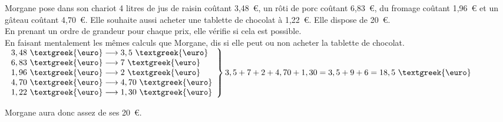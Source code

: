 Morgane pose dans son chariot 4 litres de jus de raisin coûtant
3,48~\textgreek{\euro}, un rôti de porc coûtant
6,83~\textgreek{\euro}, du fromage coûtant 1,96~\textgreek{\euro} et
un gâteau coûtant 4,70~\textgreek{\euro}. Elle souhaite aussi
acheter une tablette de chocolat à 1,22~\textgreek{\euro}. Elle dispose
de 20~\textgreek{\euro}.\\En prenant un ordre de grandeur pour chaque
prix, elle vérifie si cela est possible.
\\En faisant mentalement les mêmes calculs que Morgane, dis si elle
peut ou non acheter la tablette de chocolat.
$\left.\begin{array}{l}
3,48~\mbox{\textgreek{\euro}}\longrightarrow3,5~\mbox{\textgreek{\euro}}\\
6,83~\mbox{\textgreek{\euro}}\longrightarrow7~\mbox{\textgreek{\euro}}\\
1,96~\mbox{\textgreek{\euro}}\longrightarrow2~\mbox{\textgreek{\euro}}\\
4,70~\mbox{\textgreek{\euro}}\longrightarrow4,70~\mbox{\textgreek{\euro}}\\
1,22~\mbox{\textgreek{\euro}}\longrightarrow1,30~\mbox{\textgreek{\euro}}\\
\end{array}
\right\}3,5+7+2+4,70+1,30=3,5+9+6=18,5~\mbox{\textgreek{\euro}}$
\par Morgane aura donc assez de ses 20~\textgreek{\euro}.
